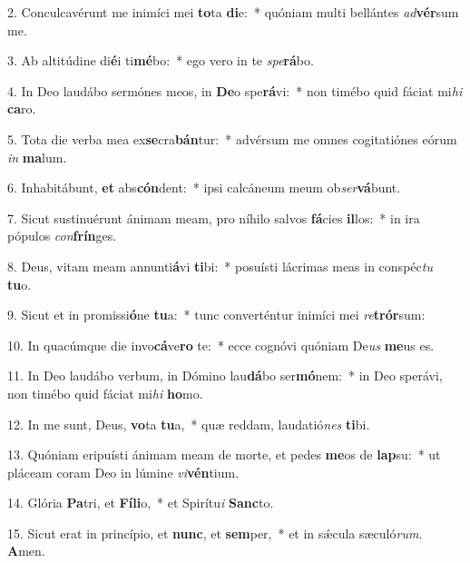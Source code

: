 2. Conculcavérunt me inimíci mei \textbf{to}ta \textbf{di}e:~*  quóniam multi bellántes \textit{ad}\textbf{vér}sum me.\

3. Ab altitúdine di\textbf{é}i ti\textbf{mé}bo:~*  ego vero in te \textit{spe}\textbf{rá}bo.\

4. In Deo laudábo sermónes meos, in \textbf{De}o spe\textbf{rá}vi:~*  non timébo quid fáciat mi\textit{hi} \textbf{ca}ro.\

5. Tota die verba mea ex\textbf{se}cra\textbf{bán}tur:~*  advérsum me omnes cogitatiónes eórum \textit{in} \textbf{ma}lum.\

6. Inhabitábunt, \textbf{et} abs\textbf{cón}dent:~*  ipsi calcáneum meum ob\textit{ser}\textbf{vá}bunt.\

7. Sicut sustinuérunt ánimam meam, pro níhilo salvos \textbf{fá}cies \textbf{il}los:~*  in ira pópulos \textit{con}\textbf{frín}ges.\

8. Deus, vitam meam annunti\textbf{á}vi \textbf{ti}bi:~*  posuísti lácrimas meas in conspéc\textit{tu} \textbf{tu}o.\

9. Sicut et in promissi\textbf{ó}ne \textbf{tu}a:~*  tunc converténtur inimíci mei \textit{re}\textbf{trór}sum:\

10. In quacúmque die invo\textbf{cá}ve\textbf{ro} te:~*  ecce cognóvi quóniam De\textit{us} \textbf{me}us es.\

11. In Deo laudábo verbum, in Dómino lau\textbf{dá}bo ser\textbf{mó}nem:~*  in Deo sperávi, non timébo quid fáciat mi\textit{hi} \textbf{ho}mo.\

12. In me sunt, Deus, \textbf{vo}ta \textbf{tu}a,~*  quæ reddam, laudatió\textit{nes} \textbf{ti}bi.\

13. Quóniam eripuísti ánimam meam de morte, et pedes \textbf{me}os de \textbf{lap}su:~*  ut pláceam coram Deo in lúmine \textit{vi}\textbf{vén}tium.\

14. Glória \textbf{Pa}tri, et \textbf{Fí}\textbf{li}o,~*  et Spirítu\textit{i} \textbf{Sanc}to.\

15. Sicut erat in princípio, et \textbf{nunc}, et \textbf{sem}per,~*  et in sǽcula sæculó\textit{rum}. \textbf{A}men.\


